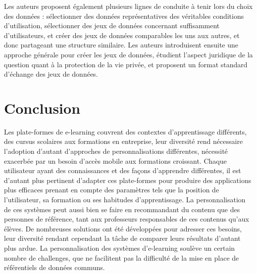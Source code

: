 \documentclass[conference]{./sty/IEEEtran}
\begin{document}
Les auteurs proposent également plusieurs lignes de conduite à tenir lors du
choix des données : sélectionner des données représentatives des véritables
conditions d'utilisation, sélectionner des jeux de données concernant
suffisamment d'utilisateurs, et créer des jeux de données comparables les uns
aux autres, et donc partageant une structure similaire. Les auteurs
introduisent ensuite une approche générale pour créer les jeux de données,
étudient l'aspect juridique de la question quant à la protection de la vie
privée, et proposent un format standard d'échange des jeux de données.\\

\section{Conclusion}

Les plate-formes de e-learning couvrent des contextes d'apprentissage
différents, des cursus scolaires aux formations en entreprise, leur diversité
rend nécessaire l'adoption d'autant d'approches de personnalisations différentes,
nécessité exacerbée par un besoin d'accès mobile aux formations croissant.
Chaque utilisateur ayant des connaissances et des façons d'apprendre
différentes, il est d'autant plus pertinent d'adapter ces plate-formes pour
produire des applications plus efficaces prenant en compte des paramètres tels
que la position de l'utilisateur, sa formation ou ses habitudes
d'apprentissage.  La personnalisation de ces systèmes peut aussi bien se faire
en recommandant du contenu que des personnes de référence, tant aux professeurs
responsables de ces contenus qu'aux élèves. De nombreuses solutions ont été
développées pour adresser ces besoins, leur diversité rendant cependant la
tâche de comparer leurs résultats d'autant plus ardue. La personnalisation des
systèmes d'e-learning soulève un certain nombre de challenges, que ne facilitent
pas la difficulté de la mise en place de référentiels de données communs.




\end{document}
